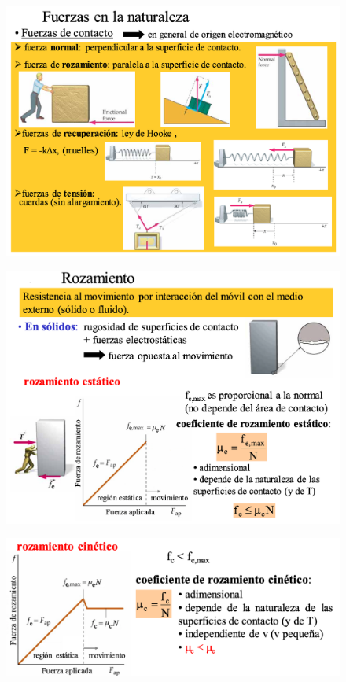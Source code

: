 \begin{figure}[H]
		\centering
		\includegraphics[width=.9\textwidth]{imagenes/imagenes03/T03IM06.png}
		\end{figure}
\begin{figure}[H]
		\centering
		\includegraphics[width=1\textwidth]{imagenes/imagenes03/T03IM07.png}
		\end{figure}
\begin{figure}[H]
		\centering
		\includegraphics[width=1\textwidth]{imagenes/imagenes03/T03IM08.png}
		\end{figure}		

